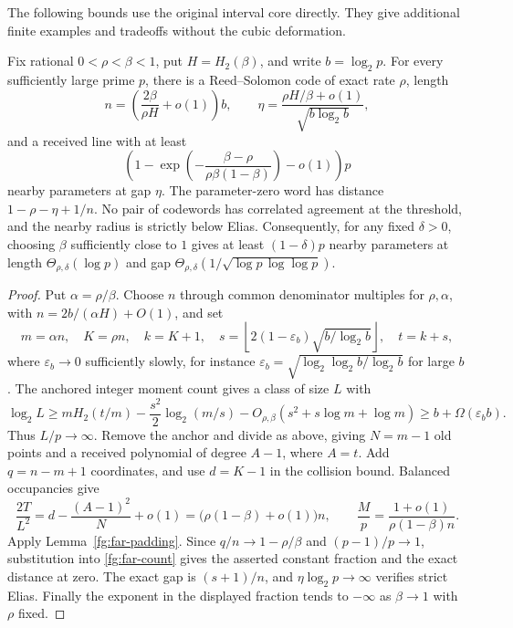 The following bounds use the original interval core directly. They give
additional finite examples and tradeoffs without the cubic deformation.

\begin{theorem}
\label{fg:dense-lines}
Fix rational $0<\rho<\beta<1$, put $H=H_2(\beta)$, and write
$b=\log_2p$. For every sufficiently large prime $p$, there is a
Reed--Solomon code of exact rate $\rho$, length
\[
 n=\left(\frac{2\beta}{\rho H}+o(1)\right)b,
 \qquad
 \eta=\frac{\rho H/\beta+o(1)}{\sqrt{b\log_2b}},
\]
and a received line with at least
\[
 \left(1-\exp\!\left(-\frac{\beta-\rho}
 {\rho\beta(1-\beta)}\right)-o(1)\right)p
\]
nearby parameters at gap $\eta$. The parameter-zero word has distance
$1-\rho-\eta+1/n$. No pair of codewords has correlated agreement at the
threshold, and the nearby radius is strictly below Elias.
Consequently, for any fixed $\delta>0$, choosing $\beta$ sufficiently
close to $1$ gives at least $(1-\delta)p$ nearby parameters at length
$\Theta_{\rho,\delta}(\log p)$ and gap
$\Theta_{\rho,\delta}(1/\sqrt{\log p\,\log\log p})$.
\end{theorem}
\begin{proof}
Put $\alpha=\rho/\beta$. Choose $n$ through common denominator
multiples for $\rho,\alpha$, with $n=2b/(\alpha H)+O(1)$, and set
\[
 m=\alpha n,\quad K=\rho n,\quad k=K+1,\quad
 s=\left\lfloor2(1-\varepsilon_b)\sqrt{b/\log_2b}\right\rfloor,
 \quad t=k+s,
\]
where $\varepsilon_b\to0$ sufficiently slowly, for instance
$\varepsilon_b=\sqrt{\log_2\log_2b/\log_2b}$ for large $b$.
The anchored integer moment count gives a class of size $L$ with
\[
 \log_2L\ge mH_2(t/m)-\frac{s^2}{2}\log_2(m/s)
 -O_{\rho,\beta}(s^2+s\log m+\log m)
 \ge b+\Omega(\varepsilon_b b).
\]
Thus $L/p\to\infty$. Remove the anchor and divide as above, giving
$N=m-1$ old points and a received polynomial of degree $A-1$, where
$A=t$. Add $q=n-m+1$ coordinates, and use $d=K-1$ in the collision
bound. Balanced occupancies give
\[
 \frac{2T}{L^2}=d-\frac{(A-1)^2}{N}+o(1)
 =\bigl(\rho(1-\beta)+o(1)\bigr)n,
 \qquad
 \frac Mp=\frac{1+o(1)}{\rho(1-\beta)n}.
\]
Apply Lemma~\ref{fg:far-padding}. Since $q/n\to1-\rho/\beta$
and $(p-1)/p\to1$, substitution into \eqref{fg:far-count} gives the
asserted constant fraction and the exact distance at zero.
The exact gap is $(s+1)/n$, and $\eta\log_2p\to\infty$ verifies
strict Elias. Finally the exponent in the displayed fraction tends
to $-\infty$ as $\beta\to1$ with $\rho$ fixed.
\end{proof}


